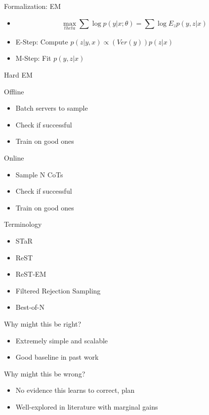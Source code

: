 \documentclass[14pt,aspectratio=169]{beamer}
\begin{document}
\begin{frame}{Formalization: EM}
	\begin{itemize}
		\item $$\max_{theta} \sum \log p(y | x; \theta) = \sum \log E_{z} p(y, z | x)$$
		\item E-Step: Compute $p(z | y, x) \propto (Ver(y)) p(z | x) $
		\item M-Step: Fit $p(y, z | x)$
	\end{itemize}
	Hard EM
\end{frame}


\begin{frame}{Offline}
	\begin{itemize}
		\item Batch servers to sample
		\item Check if successful
		\item Train on good ones
	\end{itemize}
\end{frame}


\begin{frame}{Online}
	\begin{itemize}
		\item Sample N CoTs
		\item Check if successful
		\item Train on good ones
	\end{itemize}
\end{frame}


\begin{frame}{Terminology}
	\begin{itemize}
		\item STaR
		\item ReST
		\item ReST-EM
		\item Filtered Rejection Sampling
		\item Best-of-N
	\end{itemize}
\end{frame}


\begin{frame}{Why might this be right?}
	\begin{itemize}
		\item Extremely simple and scalable
		\item Good baseline in past work
	\end{itemize}
\end{frame}

\begin{frame}{Why might this be wrong?}
	\begin{itemize}
		\item No evidence this learns to correct, plan
		\item Well-explored in literature with marginal gains
	\end{itemize}
\end{frame}
\end{document}
